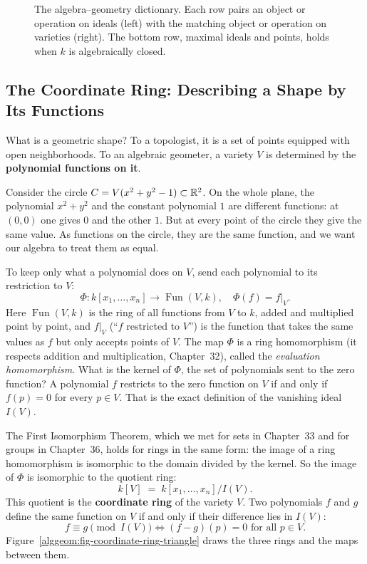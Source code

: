 \begin{figure}[htbp]
\caption{The algebra--geometry dictionary. Each row pairs an object or operation on ideals (left) with the matching object or operation on varieties (right). The bottom row, maximal ideals and points, holds when $k$ is algebraically closed.}\label{alggeom:fig-dictionary}
\end{figure}

\subsection{The Coordinate Ring: Describing a Shape by Its Functions}

What is a geometric shape? To a topologist, it is a set of points equipped with open neighborhoods. To an algebraic geometer, a variety $V$ is determined by the \textbf{polynomial functions on it}.

Consider the circle $C = V(x^2 + y^2 - 1) \subset \mathbb{R}^2$. On the whole plane, the polynomial $x^2 + y^2$ and the constant polynomial $1$ are different functions: at $(0,0)$ one gives $0$ and the other $1$. But at every point of the circle they give the same value. As functions on the circle, they are the same function, and we want our algebra to treat them as equal.

To keep only what a polynomial does on $V$, send each polynomial to its restriction to $V$:
\[
\Phi: k[x_1, \dots, x_n] \to \operatorname{Fun}(V, k), \quad \Phi(f) = f|_V.
\]
Here $\operatorname{Fun}(V, k)$ is the ring of all functions from $V$ to $k$, added and multiplied point by point, and $f|_V$ (``$f$ restricted to $V$'') is the function that takes the same values as $f$ but only accepts points of $V$. The map $\Phi$ is a ring homomorphism (it respects addition and multiplication, Chapter~32), called the \emph{evaluation homomorphism}. What is the kernel of $\Phi$, the set of polynomials sent to the zero function? A polynomial $f$ restricts to the zero function on $V$ if and only if $f(p) = 0$ for every $p \in V$. That is the exact definition of the vanishing ideal $I(V)$.

The First Isomorphism Theorem, which we met for sets in Chapter~33 and for groups in Chapter~36, holds for rings in the same form: the image of a ring homomorphism is isomorphic to the domain divided by the kernel. So the image of $\Phi$ is isomorphic to the quotient ring:
\[
k[V] \;=\; k[x_1, \dots, x_n] / I(V).
\]
This quotient is the \textbf{coordinate ring} of the variety $V$. Two polynomials $f$ and $g$ define the same function on $V$ if and only if their difference lies in $I(V)$:
\[
f \equiv g \pmod{I(V)} \iff (f - g)(p) = 0 \text{ for all } p \in V.
\]
Figure~\ref{alggeom:fig-coordinate-ring-triangle} draws the three rings and the maps between them.


